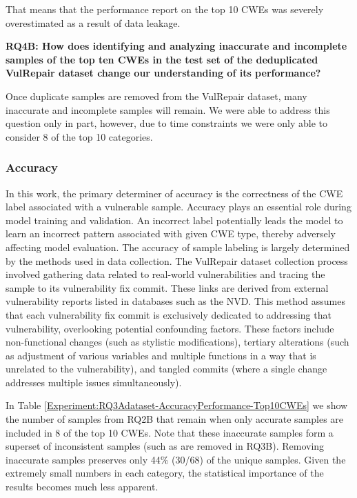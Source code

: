 That means that the performance report on the top 10 CWEs was severely overestimated as a result of data leakage.

\textbf{RQ4B: How does identifying and analyzing inaccurate and incomplete samples of the top ten CWEs in the test set of the deduplicated VulRepair dataset change our understanding of its performance?}


Once duplicate samples are removed from the VulRepair dataset, many inaccurate and incomplete samples will remain.
We were able to address this question only in part, however, due to time constraints we were only able to consider 8 of the top 10 categories.

\subsubsection{Accuracy}\label{Result-Accuracy}
In this work, the primary determiner of accuracy is the correctness of the CWE label associated with a vulnerable sample.
Accuracy plays an essential role during model training and validation.
An incorrect label potentially leads the model to learn an incorrect pattern associated with given CWE type, thereby adversely affecting model evaluation.
The accuracy of sample labeling is largely determined by the methods used in data collection.
The VulRepair dataset collection process involved gathering data related to real-world vulnerabilities and tracing the sample to its vulnerability fix commit.
These links are derived from external vulnerability reports listed in databases such as the NVD.
This method assumes that each vulnerability fix commit is exclusively dedicated to addressing that vulnerability, overlooking potential confounding factors.
These factors include non-functional changes (such as stylistic modifications), tertiary alterations (such as adjustment of various variables and multiple functions in a way that is unrelated to the vulnerability), and tangled commits (where a single change addresses multiple issues simultaneously)\cite{herzig2013impact}.

In Table \ref{Experiment:RQ3Adataset-AccuracyPerformance-Top10CWEs} we show the number of samples from RQ2B that remain when only accurate samples are included in 8 of the top 10 CWEs.
Note that these inaccurate samples form a superset of inconsistent samples (such as are removed in RQ3B).
Removing inaccurate samples preserves only 44\% (30/68) of the unique samples.
Given the extremely small numbers in each category, the statistical importance of the results becomes much less apparent.



